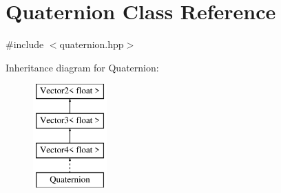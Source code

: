 \hypertarget{class_quaternion}{}\section{Quaternion Class Reference}
\label{class_quaternion}


{\ttfamily \#include $<$quaternion.\+hpp$>$}

Inheritance diagram for Quaternion\+:\begin{figure}[H]
\begin{center}
\leavevmode
\includegraphics[height=4.000000cm]{class_quaternion}
\end{center}
\end{figure}
